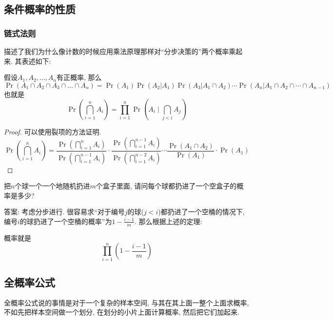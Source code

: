 \documentclass{ctexart}
\begin{document}
\subsection{条件概率的性质}

\subsubsection{链式法则} 描述了我们为什么像计数的时候应用乘法原理那样对``分步决策的''两个概率乘起来. 其表述如下: 

\begin{theorem}[链式法则]
    假设$A_1, A_2, ..., A_n$有正概率, 那么
    \[
        \Pr \left( A_1 \cap A_2 \cap A_3 \cap ... \cap A_n \right)
        =
        \Pr(A_1) \Pr(A_2|A_1)\Pr(A_3|A_1\cap A_2)\cdots\Pr(A_n|A_1\cap A_2\cap \cdots \cap A_{n-1})
    \]
    也就是
$$
\operatorname{Pr}\left(\bigcap_{i=1}^n A_i\right)=\prod_{i=1}^n \operatorname{Pr}\left(A_i \mid \bigcap_{j<i} A_j\right)
$$
\end{theorem}

\begin{proof}
    可以使用裂项的方法证明. 
    $$
\operatorname{Pr}\left(\bigcap_{i=1}^n A_i\right)=\frac{\operatorname{Pr}\left(\bigcap_{i=1}^n A_i\right)}{\operatorname{Pr}\left(\bigcap_{i=1}^{n-1} A_i\right)} \cdot \frac{\operatorname{Pr}\left(\bigcap_{i=1}^{n-1} A_i\right)}{\operatorname{Pr}\left(\bigcap_{i=1}^{n-2} A_i\right)} \cdots \frac{\operatorname{Pr}\left(A_1 \cap A_2\right)}{\operatorname{Pr}\left(A_1\right)} \cdot \operatorname{Pr}\left(A_1\right)
$$
\end{proof}

\begin{example}
    把$n$个球一个一个地随机扔进$m$个盒子里面, 请问每个球都扔进了一个空盒子的概率是多少?

    答案: 考虑分步进行. 很容易求``对于编号$j$的球($j<i$)都扔进了一个空桶的情况下, 编号$i$的球扔进了一个空桶的概率''为$1-\frac{i-1}{m}$. 那么根据上述的定理: 

概率就是
$$
\prod_{i=1}^n\left(1-\frac{i-1}{m}\right)
$$

\end{example}

\subsection{全概率公式} 全概率公式说的事情是对于一个复杂的样本空间, 与其在其上面一整个上面求概率, 不如先把样本空间做一个划分, 在划分的小片上面计算概率, 然后把它们加起来. 
\end{document}
